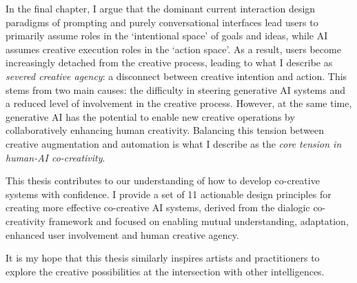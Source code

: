 In the final chapter, I argue that the dominant current interaction design paradigms of prompting and purely conversational interfaces lead users to primarily assume roles in the `intentional space' of goals and ideas, while AI assumes creative execution roles in the `action space'. As a result, users become increasingly detached from the creative process, leading to what I describe as \textit{severed creative agency}: a disconnect between creative intention and action. This stems from two main causes: the difficulty in steering generative AI systems and a reduced level of involvement in the creative process. However, at the same time, generative AI has the potential to enable new creative operations by collaboratively enhancing human creativity. Balancing this tension between creative augmentation and automation is what I describe as the \textit{core tension in human-AI co-creativity}. 

This thesis contributes to our understanding of how to develop co-creative systems with confidence. I provide a set of 11 actionable design principles for creating more effective co-creative AI systems, derived from the dialogic co-creativity framework and focused on enabling mutual understanding, adaptation, enhanced user involvement and human creative agency.

It is my hope that this thesis similarly inspires artists and practitioners to explore the creative possibilities at the intersection with other intelligences.
